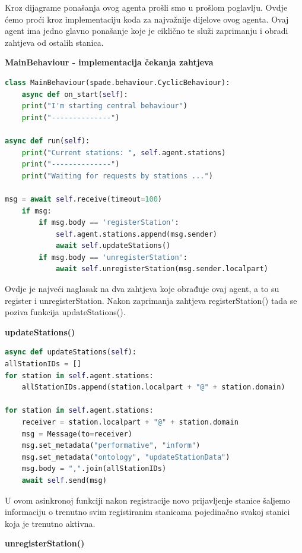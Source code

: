\documentclass{foi}
\begin{document}
Kroz dijagrame ponašanja ovog agenta prošli smo u prošlom poglavlju. Ovdje ćemo proći kroz implementaciju koda za najvažnije dijelove ovog agenta. Ovaj agent ima jedno glavno ponašanje koje je ciklično te služi zaprimanju i obradi zahtjeva od ostalih stanica.

\begin{flushleft}\textbf{MainBehaviour - implementacija čekanja zahtjeva}\end{flushleft}

\begin{lstlisting}[language=Python]
class MainBehaviour(spade.behaviour.CyclicBehaviour):
	async def on_start(self):
	print("I'm starting central behaviour")
	print("--------------")

async def run(self):
	print("Current stations: ", self.agent.stations)
	print("--------------")
	print("Waiting for requests by stations ...")

msg = await self.receive(timeout=100)
	if msg:
		if msg.body == 'registerStation':
			self.agent.stations.append(msg.sender)
			await self.updateStations()
		if msg.body == 'unregisterStation':
			await self.unregisterStation(msg.sender.localpart)
\end{lstlisting}

Ovdje je najveći naglasak na dva zahtjeva koje obrađuje ovaj agent, a to su register i unregisterStation. Nakon zaprimanja zahtjeva registerStation() tada se poziva funkcija updateStations().

\begin{flushleft}\textbf{updateStations()}\end{flushleft}

\begin{lstlisting}[language=Python]
async def updateStations(self):
allStationIDs = []
for station in self.agent.stations:
	allStationIDs.append(station.localpart + "@" + station.domain)

for station in self.agent.stations:
	receiver = station.localpart + "@" + station.domain
	msg = Message(to=receiver)
	msg.set_metadata("performative", "inform")
	msg.set_metadata("ontology", "updateStationData")
	msg.body = ",".join(allStationIDs)
	await self.send(msg)
\end{lstlisting}

U ovom asinkronoj funkciji nakon registracije novo prijavljenje stanice šaljemo informaciju o trenutno svim registiranim stanicama pojedinačno svakoj stanici koja je trenutno aktivna.

\begin{flushleft}\textbf{unregisterStation()}\end{flushleft}
\end{document}
